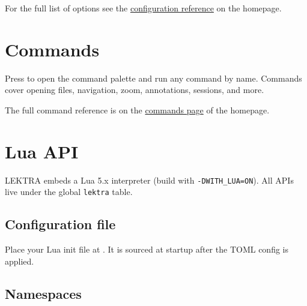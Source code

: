 \documentclass[a4paper,12pt]{article}
\begin{document}
For the full list of options see the \href{https://dheerajshenoy.github.io/lektra/configuration.html}{configuration reference} on the homepage.

\section{Commands}

Press \keys{:} to open the command palette and run any command by name. Commands cover opening files, navigation, zoom, annotations, sessions, and more.

The full command reference is on the \href{https://dheerajshenoy.github.io/lektra/commands.html}{commands page} of the homepage.

\section{Lua API}

LEKTRA embeds a Lua 5.x interpreter (build with \texttt{-DWITH\_LUA=ON}). All APIs live under the global \texttt{lektra} table.

\subsection{Configuration file}

Place your Lua init file at . It is sourced at startup after the TOML config is applied.

\subsection{Namespaces}
\end{document}
